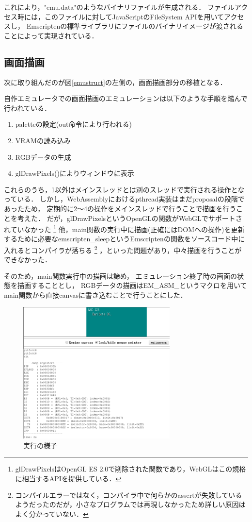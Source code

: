 \documentclass[a4j,10pt]{jsarticle}
\begin{document}
これにより，"emu.data"のようなバイナリファイルが生成される．
ファイルアクセス時には，このファイルに対してJavaScriptのFileSystem APIを用いてアクセスし，
Emscriptenの標準ライブラリにファイルのバイナリイメージが渡されることによって実現されている．

\subsection{画面描画}

次に取り組んだのが図\ref{emustruct}の左側の，画面描画部分の移植となる．

自作エミュレータでの画面描画のエミュレーションは以下のような手順を踏んで行われている．

\begin{enumerate}
	\item paletteの設定(out命令により行われる)
	\item VRAMの読み込み
	\item RGBデータの生成
	\item glDrawPixels()によりウィンドウに表示
\end{enumerate}

これらのうち，1以外はメインスレッドとは別のスレッドで実行される操作となっている．
しかし，WebAssemblyにおけるpthread実装はまだproposalの段階であったため，
定期的に2〜4の操作をメインスレッドで行うことで描画を行うことを考えた．
だが，glDrawPixelsというOpenGLの関数がWebGLでサポートされていなかった
\footnote{glDrawPixelsはOpenGL ES 2.0で削除された関数であり，WebGLはこの規格に相当するAPIを提供している．}
他，main関数の実行中に描画(正確にはDOMへの操作)を更新するために必要なemscripten\_sleepというEmscriptenの関数をソースコード中に入れるとコンパイラが落ちる
\footnote{コンパイルエラーではなく，コンパイラ中で何らかのassertが失敗しているようだったのだが，小さなプログラムでは再現しなかったため詳しい原因はよく分かっていない．}
，といった問題があり，中々描画を行うことができなかった．

そのため，main関数実行中の描画は諦め，
エミュレーション終了時の画面の状態を描画することとし，
RGBデータの描画はEM\_ASM\_というマクロを用いてmain関数から直接canvasに書き込むことで行うことにした．

\begin{figure}[htbp]
	\begin{center}
		\includegraphics[width=8cm]{./demo.png}
		\caption{実行の様子}
		\label{demo}
	\end{center}
\end{figure}
\end{document}
